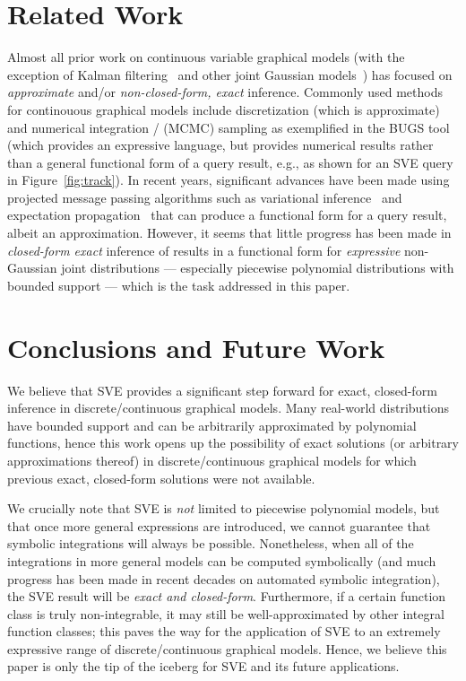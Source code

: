 \documentclass[letterpaper]{article}
\begin{document}

\section{Related Work}


Almost all prior work on continuous variable graphical models (with
the exception of Kalman filtering~\cite{kalman_filter} and other joint
Gaussian models~\cite{Weiss99correctnesof}) has focused on
\emph{approximate} and/or \emph{non-closed-form, exact} inference.
Commonly used methods for continouous graphical models include
discretization (which is approximate) and numerical integration /
(MCMC) sampling as exemplified in the BUGS tool~\cite{bugs} (which
provides an expressive language, but provides numerical results rather
than a general functional form of a query result, e.g., as shown for
an SVE query in Figure~\ref{fig:track}).  In recent years, significant
advances have been made using projected message passing algorithms
such as variational inference~\cite{variational} and expectation
propagation~\cite{minka_ep} that can produce a functional form for a
query result, albeit an approximation.  However, it seems that little
progress has been made in \emph{closed-form exact} inference of
results in a functional form for \emph{expressive} non-Gaussian joint
distributions --- especially piecewise polynomial distributions with
bounded support --- which is the task addressed in this paper.

\section{Conclusions and Future Work}

\vspace{-1mm}

We believe that SVE provides a significant step forward for exact,
closed-form inference in discrete/continuous graphical models.  Many
real-world distributions have bounded support and can be arbitrarily
approximated by polynomial functions, hence this work opens up the
possibility of exact solutions (or arbitrary approximations thereof)
in discrete/continuous graphical models for which previous exact,
closed-form solutions were not available.

We crucially note that SVE is \emph{not} limited to piecewise
polynomial models, but that once more general expressions are
introduced, we cannot guarantee that symbolic integrations will always
be possible.  Nonetheless, when all of the integrations in more
general models can be computed symbolically (and much progress has
been made in recent decades on automated symbolic integration), the
SVE result will be \emph{exact and closed-form}.  Furthermore, if a certain
function class is truly non-integrable, it may still be
well-approximated by other integral function classes; this paves the way
for the application of SVE to an extremely 
expressive range of discrete/continuous graphical models.  Hence, we
believe this paper is only the tip of the iceberg for SVE and its
future applications.



\end{document}

